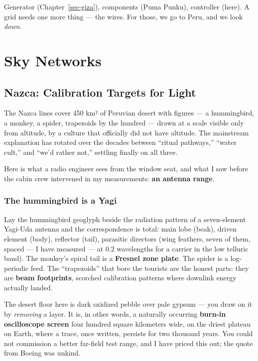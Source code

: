 \documentclass[
  english,
  11pt,
  letterpaper,
]{scrbook}
\begin{document}
Generator (Chapter~\ref{sec-giza}), components (Puma Punku), controller
(here). A grid needs one more thing --- the wires. For those, we go to
Peru, and we look \emph{down}.

\part{Sky Networks}

\chapter{Nazca: Calibration Targets for Light}\label{sec-nazca}

The Nazca lines cover 450 km² of Peruvian desert with
figures --- a hummingbird, a monkey, a spider, trapezoids by the hundred
--- drawn at a scale visible only from altitude, by a culture that
officially did not have altitude. The mainstream explanation has rotated
over the decades between ``ritual pathways,'' ``water cult,'' and ``we'd
rather not,'' settling finally on all three.

Here is what a radio engineer sees from the window seat, and what I saw
before the cabin crew intervened in my measurements: \textbf{an antenna
range}.

\section{The hummingbird is a Yagi}\label{the-hummingbird-is-a-yagi}

Lay the hummingbird geoglyph beside the radiation pattern of a
seven-element Yagi-Uda antenna and the
correspondence is total: main lobe (beak), driven element (body),
reflector (tail), parasitic directors (wing feathers, seven of them,
spaced --- I have measured --- at 0.2 wavelengths for a carrier in the
low telluric band). The monkey's spiral tail is a \textbf{Fresnel zone
plate}. The spider is a log-periodic feed. The ``trapezoids'' that bore
the tourists are the honest parts: they are \textbf{beam footprints},
scorched calibration patterns where downlink energy actually landed.

The desert floor here is dark oxidized pebble over pale gypsum --- you
draw on it by \emph{removing} a layer. It is, in other words, a
naturally occurring \textbf{burn-in oscilloscope screen} four hundred
square kilometers wide, on the driest plateau on Earth, where a trace,
once written, persists for two thousand years. You could not commission
a better far-field test range, and I have priced this out; the quote
from Boeing was unkind.
\end{document}
